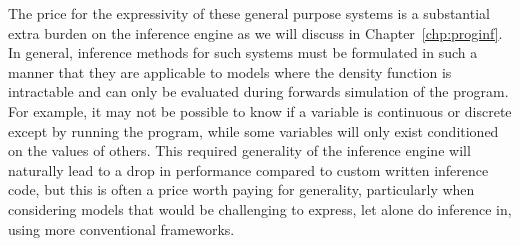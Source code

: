 The price for the expressivity of these general purpose systems is a substantial extra 
burden on the inference engine as we will
discuss in Chapter~\ref{chp:proginf}.  In general, inference methods for such systems 
must be formulated in such a manner that they are applicable to models where the 
density function is intractable and can only be evaluated during forwards simulation of the program. 
For example, it may not be possible to know if a variable is continuous or discrete except by
running the program, while some variables will only exist conditioned on the values of others.
This required generality of the inference engine will naturally lead to a drop in performance compared to
custom written inference code, but this is often a price worth paying for generality, particularly
when considering models that would be challenging to express, let alone do inference in, using more
conventional frameworks.